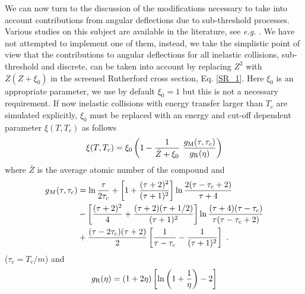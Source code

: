 We can now turn to the discussion of the modifications necessary
to take into account contributions from angular deflections
due to sub-threshold processes. Various studies on this subject
are available in the literature, see {\em e.g.} \cite{Sc63,Fa54,BW89}.
We have not attempted to implement one of them, instead, we
take the simplistic point of view that the contributions
to angular deflections for all inelastic collisions, sub-threshold
and discrete, can be taken into account by replacing
$Z^2$ with $Z (Z + \xi_{0})$ in the screened Rutherford
cross section, Eq. \eqref{SR_1}. Here $\xi_0$ is an appropriate
parameter, we use by default $\xi_0=1$ but this is not a necessary
requirement. If now inelastic collisions with energy transfer
larger than $T_c$ are simulated explicitly, $\xi_0$ must
be replaced with an energy and cut-off dependent parameter $\xi(T,T_c)$
as follows \cite{Ka96c}
\begin{equation}
\xi(T,T_c) = \xi_0 \left(1 - {1 \over \bar{Z} + \xi_0}~
{g_{\rm M}(\tau,\tau_c) \over g_{\rm R}(\eta) } \right)
\end{equation}
where $\bar{Z}$ is the average atomic number of the compound
and %
\newcommand{\tpr}{\tau^{\prime}}
\begin{equation}
\begin{split}
g_M(\tau,\tau_c) & =
\ln {\tau \over 2 \tau_c} + \left[1 +
{(\tau + 2)^2 \over (\tau+1)^2} \right] \ln {2 (\tau-\tau_c+2) \over \tau + 4}
\\ &-
\left[{(\tau+2)^2 \over 4} + {(\tau+2) (\tau+1/2) \over (\tau+1)^2} \right]
\ln {(\tau+4) (\tau-\tau_c) \over \tau (\tau-\tau_c+2)} \\ & +
{(\tau-2 \tau_c) (\tau+2) \over 2}
\left[{1 \over \tau-\tau_c} - {1 \over (\tau+1)^2} \right]~.
\end{split}
\end{equation}
($\tau_c = T_c/m$) and
\begin{equation}
g_{\rm R}(\eta) = (1 + 2 \eta) \left[ \ln \left(1 + \frac{1}{\eta} \right) - 2
\right]
\end{equation}

